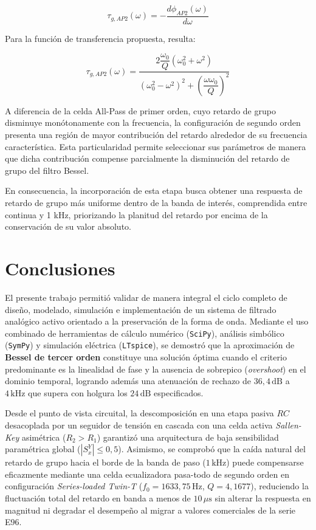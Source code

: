 \documentclass[12pt]{article}
\begin{document}
\begin{itemize}
\[
\tau_{g,AP2}(\omega)=
-\frac{d\phi_{AP2}(\omega)}{d\omega}
\]

Para la función de transferencia propuesta, resulta:

\[
\boxed{
\tau_{g,AP2}(\omega)=
\frac{
2\dfrac{\omega_0}{Q}(\omega_0^2+\omega^2)
}{
(\omega_0^2-\omega^2)^2+
\left(\dfrac{\omega\omega_0}{Q}\right)^2
}
}
\]

A diferencia de la celda All-Pass de primer orden, cuyo retardo de grupo disminuye monótonamente con la frecuencia, la configuración de segundo orden presenta una región de mayor contribución del retardo alrededor de su frecuencia característica. Esta particularidad permite seleccionar sus parámetros de manera que dicha contribución compense parcialmente la disminución del retardo de grupo del filtro Bessel.

En consecuencia, la incorporación de esta etapa busca obtener una respuesta de retardo de grupo más uniforme dentro de la banda de interés, comprendida entre continua y 1 kHz, priorizando la planitud del retardo por encima de la conservación de su valor absoluto.





\section{Conclusiones}

El presente trabajo permitió validar de manera integral el ciclo completo de diseño, modelado, simulación e implementación de un sistema de filtrado analógico activo orientado a la preservación de la forma de onda. Mediante el uso combinado de herramientas de cálculo numérico (\texttt{SciPy}), análisis simbólico (\texttt{SymPy}) y simulación eléctrica (\texttt{LTspice}), se demostró que la aproximación de \textbf{Bessel de tercer orden} constituye una solución óptima cuando el criterio predominante es la linealidad de fase y la ausencia de sobrepico (\textit{overshoot}) en el dominio temporal, logrando además una atenuación de rechazo de $36,4\,\text{dB}$ a $4\,\text{kHz}$ que supera con holgura los $24\,\text{dB}$ especificados.

Desde el punto de vista circuital, la descomposición en una etapa pasiva $RC$ desacoplada por un seguidor de tensión en cascada con una celda activa \textit{Sallen-Key} asimétrica ($R_2 > R_1$) garantizó una arquitectura de baja sensibilidad paramétrica global ($|S^Y_x| \le 0,5$). Asimismo, se comprobó que la caída natural del retardo de grupo hacia el borde de la banda de paso ($1\,\text{kHz}$) puede compensarse eficazmente mediante una celda ecualizadora pasa-todo de segundo orden en configuración \textit{Series-loaded Twin-T} ($f_0 = 1633,75\,\text{Hz}$, $Q = 4,1677$), reduciendo la fluctuación total del retardo en banda a menos de $10\,\mu\text{s}$ sin alterar la respuesta en magnitud ni degradar el desempeño al migrar a valores comerciales de la serie E96.


\end{itemize}
\end{document}
